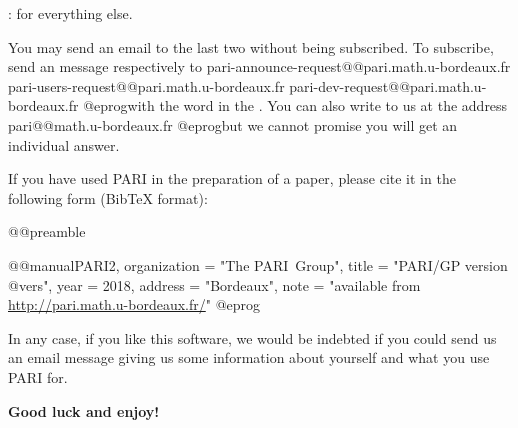 \item {}: for everything else.

\noindent You may send an email to the last two without being subscribed.
To subscribe, send an message respectively to
\def\@{@}
\bprog
  pari-announce-request@@pari.math.u-bordeaux.fr
     pari-users-request@@pari.math.u-bordeaux.fr
       pari-dev-request@@pari.math.u-bordeaux.fr
@eprog\noindent with the word  in the .
You can also write to us at the address
\bprog
  pari@@math.u-bordeaux.fr
@eprog\noindent but we cannot promise you will get an individual answer.
\smallskip

If you have used PARI in the preparation of a paper, please cite it in the
following form (BibTeX format):

\bprog
@@preamble{\usepackage{url}}
@@manual{PARI2,
    organization = "{The PARI~Group}",
    title        = "{PARI/GP version @vers}",
    year         = 2018,
    address      = "Bordeaux",
    note         = "available from \url{http://pari.math.u-bordeaux.fr/}"
}
@eprog
\smallskip

\noindent In any case, if you like this software, we would be indebted if you
could send us an email message giving us some information about yourself and
what you use PARI for.

\medskip
{\bf Good luck and enjoy!}
\vfill\eject
